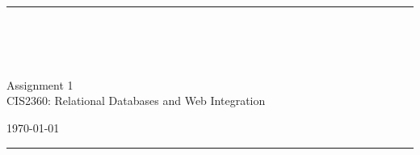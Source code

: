 \fancyhead[C]{}
\hrule \medskip
\begin{minipage}{0.295\textwidth} 
\raggedright
\footnotesize
\yourname\hfill\\ 
\yournetid\hfill\\ 
\youremail\\
\end{minipage}
\begin{minipage}{0.4\textwidth} 
\centering 
\large 
Assignment 1\\
\normalsize 
CIS2360: Relational Databases and Web Integration\\
\end{minipage}
\begin{minipage}{0.295\textwidth} 
\raggedleft
\today\hfill\\
\end{minipage}
\medskip\hrule 
\bigskip
